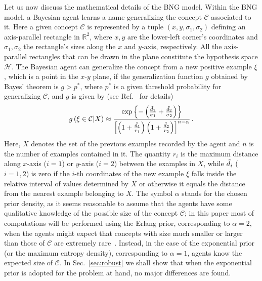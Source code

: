 \documentclass[review]{elsarticle}
\newcommand{\td}{\Tilde{d}}
\newcommand{\+}{\! + \!}
\begin{document}
Let us now discuss the mathematical details of the BNG model.
Within the BNG model, a Bayesian agent learns a name generalizing the concept $\mathcal{C}$  associated to it. 
Here a given concept $\mathcal{C}$ is represented by a tuple $\left( x, y,  \sigma_1,  \sigma_2 \right)$ defining an  axis-parallel rectangle in $\mathbb{R}^{2}$, where $x, y$ are the lower-left corner's  coordinates and  $\sigma_1,  \sigma_2$ the rectangle's sizes along the $x$ and $y$-axis, respectively. 
All the axis-parallel rectangles that can be drawn in the plane constitute the hypothesis space $\mathcal{H}$. 
The Bayesian agent can generalize the concept  from a new positive example $\xi$, which is a point in the $x$-$y$ plane, if the generalization function $g$ obtained by Bayes' theorem is $g > p^*$, where $p^*$ is a given threshold probability for generalizing $\mathcal{C}$, and $g$ is given by  (see Ref.~\cite{Tenenbaum-1999} for details)
%
\begin{equation}\label{eq:generalization}
    g \left( \xi \in \mathcal{C} | X \right) 
    \approx 
    \frac{\exp \left \{ -  \left(   \frac{\td_1 }{\sigma_1} +     \frac{\td_2 }{\sigma_2 }      \right)   \right \} }
              {\left[ \left( 1 + \frac{\td_1 }{r_1} \right) \left( 1 + \frac{\td_2 }{r_2} \right) \right]^{n - \alpha} }  \, .
\end{equation}
%
Here, $X$ denotes the set of the previous examples recorded by the agent and $n$ is the number of examples contained in it.
The quantity $r_i$ is the maximum distance along $x$-axis ($i = 1$) or $y$-axis  ($i =  2$) between the examples in $X$, while $\td_i$ ($i=1,2$) is zero if the $i$-th coordinates of the new example $\xi$ falls inside the relative interval of values determined by $X$ or otherwise it equals the distance from the nearest example belonging to $X$.
The symbol $\alpha$ stands for the chosen  prior density, as it seems reasonable to assume that the agents have some qualitative  knowledge of the possible size of the concept $\mathcal{C}$; in this paper most of computations will be performed using the Erlang prior, corresponding to $\alpha = 2 $, when the agents might expect that concepts with size much smaller or larger than those of $\mathcal{C}$ are extremely rare~\cite{Tenenbaum-1999}. 
Instead, in the case of the exponential prior (or the maximum entropy density), corresponding to $\alpha = 1$, agents know the expected size of $\mathcal{C}$.
In Sec.~\ref{sec:robust} we shall show that when the exponential prior is adopted for the problem at hand, no major differences are found.
\end{document}
